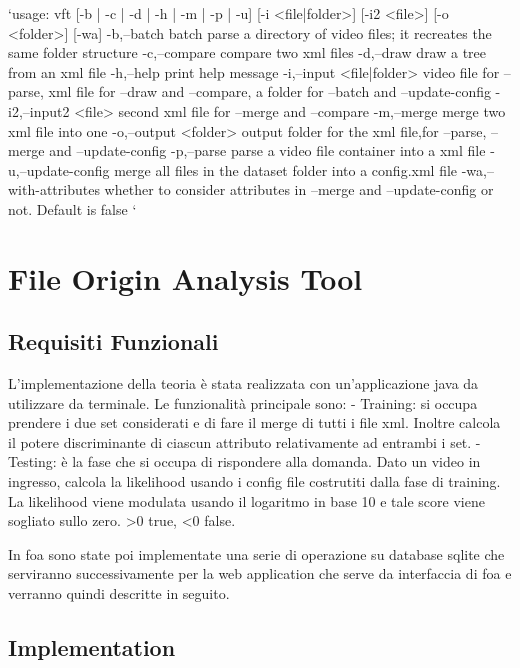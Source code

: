 `usage: vft [-b | -c | -d | -h | -m | -p | -u]    [-i <file|folder>] [-i2
       <file>]  [-o <folder>]   [-wa]
 -b,--batch                 batch parse a directory of video files; it
                            recreates the same folder structure
 -c,--compare               compare two xml files
 -d,--draw                  draw a tree from an xml file
 -h,--help                  print help message
 -i,--input <file|folder>   video file for --parse, xml file for --draw
                            and --compare, a folder for --batch and
                            --update-config
 -i2,--input2 <file>        second xml file for --merge and --compare
 -m,--merge                 merge two xml file into one
 -o,--output <folder>       output folder for the xml file,for --parse,
                            --merge and --update-config
 -p,--parse                 parse a video file container into a xml file
 -u,--update-config         merge all files in the dataset folder into a
                            config.xml file
 -wa,--with-attributes      whether to consider attributes in --merge and
                            --update-config or not. Default is false
`


\section{File Origin Analysis Tool}

\subsection{Requisiti Funzionali}

L'implementazione della teoria è stata realizzata con un'applicazione java da utilizzare da terminale. Le funzionalità principale sono:
- Training: si occupa prendere i due set considerati e di fare il merge di tutti i file xml. Inoltre calcola il potere discriminante di ciascun attributo relativamente ad entrambi i set.
- Testing: è la fase che si occupa di rispondere alla domanda. Dato un video in ingresso, calcola la likelihood usando i config file costrutiti dalla fase di training. La likelihood viene modulata usando il logaritmo in base 10 e tale score viene sogliato sullo zero. >0 true, <0 false.

In foa sono state poi implementate una serie di operazione su database sqlite che serviranno successivamente per la web application che serve da interfaccia di foa e verranno quindi descritte in seguito.

\subsection{Implementation}

